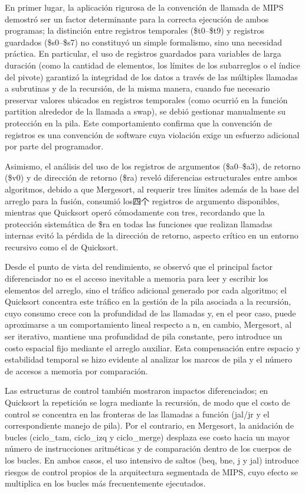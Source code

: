 \documentclass[12pt, letterpaper]{article}
\begin{document}
En primer lugar, la aplicación rigurosa de la convención de llamada de MIPS demostró ser un factor determinante para la correcta ejecución de ambos programas; la distinción entre registros temporales (\$t0–\$t9) y registros guardados (\$s0–\$s7) no constituyó un simple formalismo, sino una necesidad práctica. En particular, el uso de registros guardados para variables de larga duración (como la cantidad de elementos, los límites de los subarreglos o el índice del pivote) garantizó la integridad de los datos a través de las múltiples llamadas a subrutinas y de la recursión, de la misma manera, cuando fue necesario preservar valores ubicados en registros temporales (como ocurrió en la función partition alrededor de la llamada a swap), se debió gestionar manualmente su protección en la pila. Este comportamiento confirma que la convención de registros es una convención de software cuya violación exige un esfuerzo adicional por parte del programador.

Asimismo, el análisis del uso de los registros de argumentos (\$a0–\$a3), de retorno (\$v0) y de dirección de retorno (\$ra) reveló diferencias estructurales entre ambos algoritmos, debido a que Mergesort, al requerir tres límites además de la base del arreglo para la fusión, consumió los四个 registros de argumento disponibles, mientras que Quicksort operó cómodamente con tres, recordando que la protección sistemática de \$ra en todas las funciones que realizan llamadas internas evitó la pérdida de la dirección de retorno, aspecto crítico en un entorno recursivo como el de Quicksort.

Desde el punto de vista del rendimiento, se observó que el principal factor diferenciador no es el acceso inevitable a memoria para leer y escribir los elementos del arreglo, sino el tráfico adicional generado por cada algoritmo; el Quicksort concentra este tráfico en la gestión de la pila asociada a la recursión, cuyo consumo crece con la profundidad de las llamadas y, en el peor caso, puede aproximarse a un comportamiento lineal respecto a n, en cambio, Mergesort, al ser iterativo, mantiene una profundidad de pila constante, pero introduce un costo espacial fijo mediante el arreglo auxiliar. Esta compensación entre espacio y estabilidad temporal se hizo evidente al analizar los marcos de pila y el número de accesos a memoria por comparación.

Las estructuras de control también mostraron impactos diferenciados; en Quicksort la repetición se logra mediante la recursión, de modo que el costo de control se concentra en las fronteras de las llamadas a función (jal/jr y el correspondiente manejo de pila). Por el contrario, en Mergesort, la anidación de bucles (ciclo\_tam, ciclo\_izq y ciclo\_merge) desplaza ese costo hacia un mayor número de instrucciones aritméticas y de comparación dentro de los cuerpos de los bucles. En ambos casos, el uso intensivo de saltos (beq, bne, j y jal) introduce riesgos de control propios de la arquitectura segmentada de MIPS, cuyo efecto se multiplica en los bucles más frecuentemente ejecutados.
\end{document}
